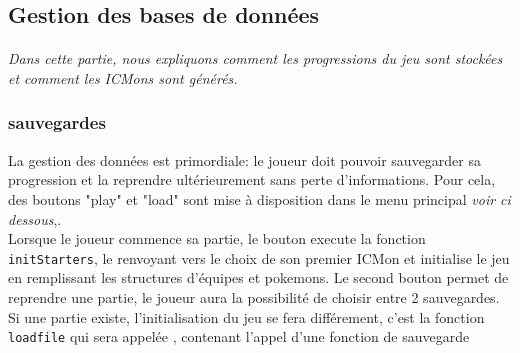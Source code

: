 \documentclass[12pt,a4paper, twoside]{article}
\begin{document}
\subsection{Gestion des bases de données}
\paragraph{} \emph{Dans cette partie, nous expliquons comment les progressions du jeu sont stockées et comment les ICMons sont générés.}
    \subsubsection{sauvegardes}
     La gestion des données est primordiale: le joueur doit pouvoir sauvegarder sa progression et la reprendre ultérieurement sans perte d'informations.
     Pour cela, des boutons "play" et "load" sont mise à disposition dans le menu principal \emph{voir ci dessous},.\\
     Lorsque le joueur commence sa partie, le bouton execute la fonction \texttt{initStarters}, le renvoyant vers le choix de son premier ICMon et initialise le jeu en remplissant les structures d'équipes et pokemons.
     Le second bouton permet de reprendre une partie, le joueur aura la possibilité de choisir entre 2 sauvegardes. Si une partie existe, l'initialisation du jeu se fera différement, c'est la fonction \texttt{loadfile} qui sera appelée , contenant l'appel d'une fonction de sauvegarde\\
\end{document}
